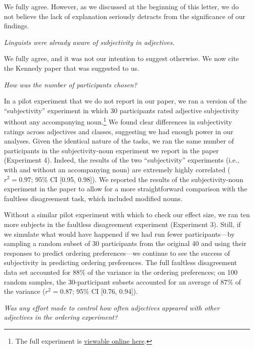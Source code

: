 \documentclass[12pt]{article}
\begin{document}
We fully agree. However, as we discussed at the beginning of this letter, we do not believe the lack of explanation seriously detracts from the significance of our findings.


\item \emph{Linguists were already aware of subjectivity in adjectives.}

We fully agree, and it was not our intention to suggest otherwise. We now cite the Kennedy paper that was suggested to us.


\item \emph{How was the number of participants chosen?}

In a pilot experiment that we do not report in our paper, we ran a version of the ``subjectivity'' experiment in which 30 participants rated adjective subjectivity without any accompanying noun.\footnote{The full experiment is \href{http://web.stanford.edu/~scontras/adjective_ordering/experiments/6-subjectivity/subjectivity.html}{viewable online here}.} We found clear differences in subjectivity ratings across adjectives and classes, suggesting we had enough power in our analyses. 
Given the identical nature of the tasks, we ran the same number of participants in the subjectivity-noun experiment we report in the paper (Experiment 4). Indeed, the results of the two ``subjectivity'' experiments (i.e., with and without an accompanying noun) are extremely highly correlated ($r^2=0.97$; 95\% CI [0.95,  0.98]). We reported the results of the subjectivity-noun experiment in the paper to allow for a more straightforward comparison with the faultless disagreement task, which included modified nouns.

Without a similar pilot experiment with which to check our effect size, we ran ten more subjects in the faultless disagreement experiment (Experiment 3). Still, if we simulate what would have happened if we had run fewer participants---by sampling a random subset of 30 participants from the original 40 and using their responses to predict ordering preferences---we continue to see the success of subjectivity in predicting ordering preferences. The full faultless disagreement data set accounted for 88\% of the variance in the ordering preferences; on 100 random samples, the 30-participant subsets accounted for an average of 87\% of the variance ($r^2=0.87$; 95\% CI [0.76, 0.94]).


\item \emph{Was any effort made to control how often adjectives appeared with other adjectives in the ordering experiment?}
\end{document}

